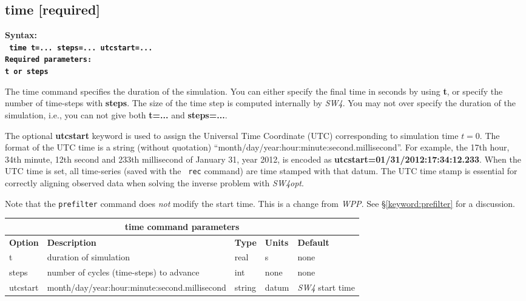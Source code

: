 \documentclass[11pt]{report}
\begin{document}
\subsection{time [required]}
\begin{flushleft}
\bf Syntax:\\
\tt
time t=... steps=... utcstart=...\\
\bf Required parameters:\\
\tt t \rm or \tt steps
\end{flushleft}
The time command specifies the duration of the simulation. You can either specify the final time in
seconds by using {\bf t}, or specify the number of time-steps with {\bf steps}.  The size of the
time step is computed internally by \emph{SW4}. You may not over specify the duration of the
simulation, i.e., you can not give both {\bf t=...} and {\bf steps=...}.

The optional {\bf utcstart} keyword is used to assign the Universal Time Coordinate (UTC)
corresponding to simulation time $t=0$. The format of the UTC time is a string (without quotation)
``month/day/year:hour:minute:second.millisecond''. For example, the 17th hour, 34th minute, 12th
second and 233th millisecond of January 31, year 2012, is encoded as {\bf
  utcstart=01/31/2012:17:34:12.233}. When the UTC time is set, all time-series (saved with the {\tt
  rec} command) are time stamped with that datum. The UTC time stamp is essential for correctly
aligning observed data when solving the inverse problem with \emph{SW4opt}.

Note that the \verb+prefilter+ command does {\it not} modify the start time. This is a change from
\emph{WPP}. See \S\ref{keyword:prefilter} for a discussion.
%
\begin{center}
\begin{tabular}{|l|p{8cm}|l|l|l|} \hline
\multicolumn{5}{|c|}{\bf time command parameters}\\ \hline
{\bf Option} & {\bf Description} & {\bf Type} & {\bf Units} & {\bf Default} \\ \hline \hline
t & duration of simulation & real & s	& none \\ \hline
steps & number of cycles (time-steps) to advance & int & none & none\\ \hline
utcstart & month/day/year:hour:minute:second.millisecond & string & datum & {\emph{SW4} start time}\\ \hline
\end{tabular}
\end{center}
\end{document}
